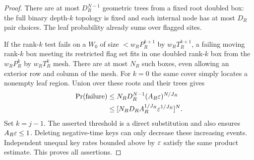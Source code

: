 \begin{proof}
There are at most \(D_{R}^{N-1}\) geometric trees from a fixed root doubled box: the full binary depth-\(k\) topology is fixed and each internal node has at most \(D_{R}\) pair choices. The leaf probability already sums over flagged sites.

If the rank-\(k\) test fails on a \(W_0\) of size \(<w_{R} P_{R}^{k+1}\) by \(w_{R} T_{R}^{k+1}\), a failing moving rank-\(k\) box meeting its restricted flag set fits in one doubled rank-\(k\) box from the \(w_{R} P_{R}^{k}\) by \(w_{R} T_{R}^{k}\) mesh. There are at most \(N_{R}\) such boxes, even allowing an exterior row and column of the mesh. For \(k=0\) the same cover simply locates a nonempty leaf region. Union over these roots and their trees gives
\[
\begin{aligned}
\operatorname{Pr}(\mathrm{failure}) &\le N_{R} D_{R}^{N-1} (A_{R} \varepsilon)^{N/J_{R}}\\
&\le [N_{R} D_{R} A_{R}^{1/J_{R}} \varepsilon^{1/J_{R}}]^{N}.
\end{aligned}
\]
Set \(k=j-1\). The asserted threshold is a direct substitution and also ensures \(A_{R} \varepsilon \le  1\). Deleting negative-time keys can only decrease these increasing events. Independent unequal key rates bounded above by \(\varepsilon\) satisfy the same product estimate. This proves all assertions. 
\end{proof}

